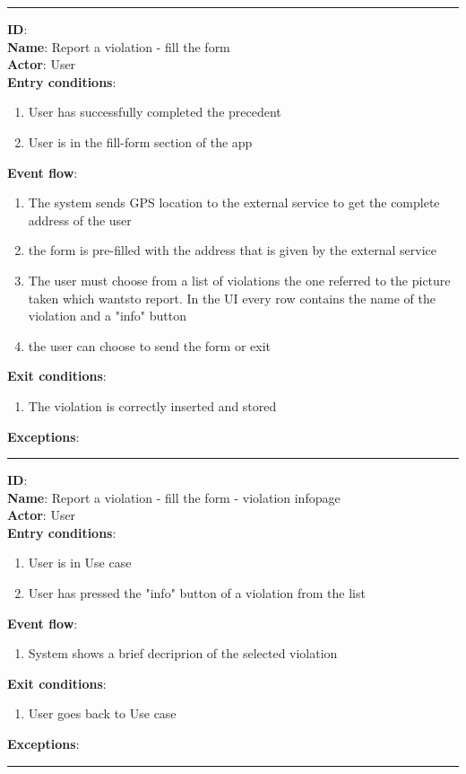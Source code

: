  \rule{\linewidth}{0.4pt}
  \textbf{ID}:  \\
  \textbf{Name}: Report a violation - fill the form \\
  \textbf{Actor}: User   \\
  \textbf{Entry conditions}:
  \begin{enumerate}
    \item{User has successfully completed the precedent }
    \item{User is in the fill-form section of the app}
  \end{enumerate}
  \textbf{Event flow}:
  \begin{enumerate}
    \item{The system sends GPS location to the external service to get the complete address of the user}
    \item{the form is pre-filled with the address that is given by the external service  }
    \item{The user must choose from a list of violations the one referred to the picture taken which wantsto report. In the UI every row contains the name of the violation and a "info" button}
    \item{the user can choose to send the form or exit}
  \end{enumerate}
  \textbf{Exit conditions}:
  \begin{enumerate}
    \item{The violation is correctly inserted and stored}
  \end{enumerate}
  \textbf{Exceptions}:
  \begin{enumerate}
  \end{enumerate}
  \rule{\linewidth}{0.4pt}
  \textbf{ID}:  \\
  \textbf{Name}: Report a violation - fill the form - violation infopage \\
  \textbf{Actor}: User   \\
  \textbf{Entry conditions}:
  \begin{enumerate}
    \item{User is in Use case  }
    \item{User has pressed the "info" button of a violation from the list }
  \end{enumerate}
  \textbf{Event flow}:
  \begin{enumerate}
    \item{System shows a brief decriprion of the selected violation}
  \end{enumerate}
  \textbf{Exit conditions}:
  \begin{enumerate}
    \item{User goes back to Use case }
  \end{enumerate}
  \textbf{Exceptions}:
  \begin{enumerate}
  \end{enumerate}
  \rule{\linewidth}{0.4pt}

